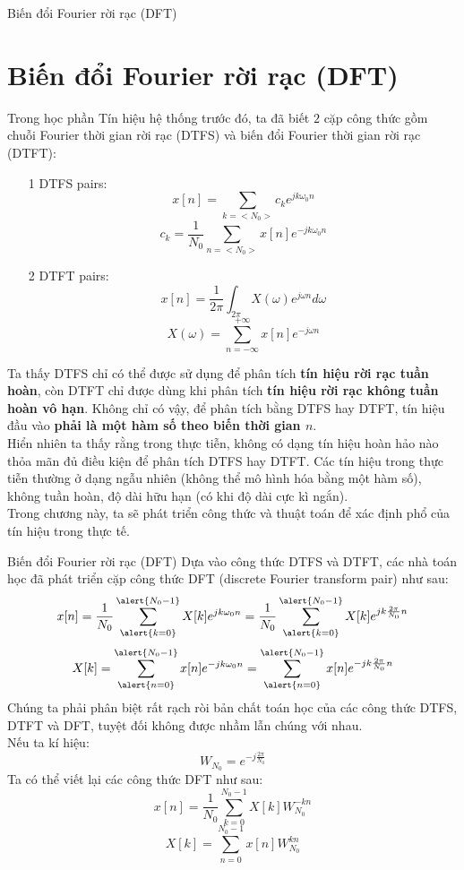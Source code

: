\documentclass[8pt]{beamer}
\begin{document}
\begin{frame}{Biến đổi Fourier rời rạc (DFT)}
\section{Biến đổi Fourier rời rạc (DFT)}
Trong học phần \alert{Tín hiệu hệ thống} trước đó, ta đã biết $2$ cặp công thức gồm chuỗi Fourier thời gian rời rạc (DTFS) và biến đổi Fourier thời gian rời rạc (DTFT):
\begin{enumerate}
	\item[1]  DTFS pairs: $$x[n]=\sum_{k=<N_{0}>}c_{k}e^{jk\omega_{0}n}$$
		$$c_{k}=\frac{1}{N_{0}}\sum_{n=<N_{0}>}x[n]e^{-jk\omega_{0}n}$$
	\item[2] DTFT pairs: $$x[n]=\frac{1}{2\pi}\int_{2\pi}X(\omega)e^{j\omega n}d\omega$$
		$$X(\omega)=\sum_{n=-\infty}^{+\infty}x[n]e^{-j\omega n}$$
\end{enumerate}
Ta thấy DTFS chỉ có thể được sử dụng để phân tích \textbf{tín hiệu rời rạc tuần hoàn}, còn DTFT chỉ được dùng khi phân tích \textbf{tín hiệu rời rạc không tuần hoàn vô hạn}. Không chỉ có vậy, để phân tích bằng DTFS hay DTFT, tín hiệu đầu vào \textbf{phải là một hàm số theo biến thời gian $n$}.
\\ Hiển nhiên ta thấy rằng trong thực tiễn, \alert{không có dạng tín hiệu hoàn hảo nào thỏa mãn đủ điều kiện để phân tích DTFS hay DTFT}. Các tín hiệu trong thực tiễn thường ở dạng \alert{ngẫu nhiên} (không thể mô hình hóa bằng một hàm số), \alert{không tuần hoàn}, \alert{độ dài hữu hạn} (có khi độ dài cực kì ngắn).
\\ Trong chương này, ta sẽ phát triển công thức và thuật toán để xác định phổ của tín hiệu trong thực tế.
\end{frame}
\begin{frame}{Biến đổi Fourier rời rạc (DFT)}
Dựa vào công thức DTFS và DTFT, các nhà toán học đã phát triển cặp công thức DFT (discrete Fourier transform pair) như sau:
$$x[n]=\frac{1}{N_{0}}\sum_{\alert{k=0}}^{\alert{N_{0}-1}}X[k]e^{jk\omega_{0}n}=\frac{1}{N_{0}}\sum_{\alert{k=0}}^{\alert{N_{0}-1}}X[k]e^{jk\frac{2\pi}{N_{0}}n}$$
$$X[k]=\sum_{\alert{n=0}}^{\alert{N_{0}-1}}x[n]e^{-jk\omega_{0}n}=\sum_{\alert{n=0}}^{\alert{N_{0}-1}}x[n]e^{-jk\frac{2\pi}{N_{0}}n}$$
Chúng ta phải phân biệt rất rạch ròi bản chất toán học của các công thức DTFS, DTFT và DFT, tuyệt đối không được nhầm lẫn chúng với nhau. 
\\ Nếu ta kí hiệu: $$W_{N_{0}}=e^{-j\frac{2\pi}{N_{0}}}$$
Ta có thể viết lại các công thức DFT như sau:
$$x[n]=\frac{1}{N_{0}}\sum_{k=0}^{N_{0}-1}X[k]W_{N_{0}}^{-kn}$$
$$X[k]=\sum_{n=0}^{N_{0}-1}x[n]W_{N_{0}}^{kn}$$
\end{frame}
\end{document}
